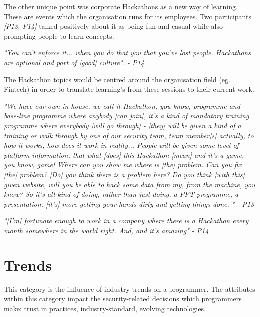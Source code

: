 \newline
\par 
The other unique point was corporate Hackathons as a new way of learning. These are events which the organisation runs for its employees. Two participants \textit{[P13, P14]} talked positively about it as being fun and casual while also prompting people to learn concepts. 
\newline
\par
\textit{"You can't enforce it... when you do that you that you've lost people. Hackathons are optional and part of [good] culture". - P14}
\newline
\par
The Hackathon topics would be centred around the organisation field (eg. Fintech) in order to translate learning's from these sessions to their current work. 
\newline
\par
\textit{"We have our own in-house, we call it Hackathon, you know, programme and base-line programme where anybody [can join], it's a kind of mandatory training programme where everybody [will go through] - [they] will be given a kind of a training or walk through by one of our security team, team member[s] actually, to how it works, how does it work in reality... People will be given some level of platform information, that what [does] this Hackathon [mean] and it's a game, you know, game! Where can you show me where is [the] problem. Can you fix [the] problem? [Do] you think there is a problem here? Do you think [with this] given website, will you be able to hack some data from my, from the machine, you know? So it's all kind of doing, rather than just doing, a PPT programme, a presentation, [it's] more getting your hands dirty and getting things done. " - P13 }
\newline
\par
\textit{"[I'm] fortunate enough to work in a company where there is a Hackathon every month somewhere in the world right. And, and it's amazing" - P14}

\section{Trends}

\par This category is the influence of industry trends on a programmer. The attributes within this category impact the security-related decisions which programmers make: trust in practices, industry-standard, evolving technologies. 

